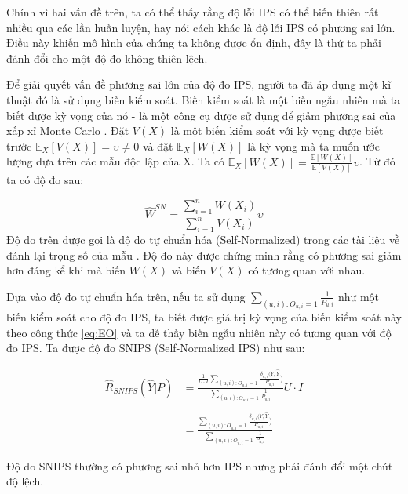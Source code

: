 Chính vì hai vấn đề trên, ta có thể thấy rằng độ lỗi IPS có thể biến thiên rất nhiều qua các lần huấn luyện, hay nói cách khác là độ lỗi IPS có phương sai lớn. Điều này khiến mô hình của chúng ta không được ổn định, đây là thứ ta phải đánh đổi cho một độ đo không thiên lệch. 

Để giải quyết vấn đề phương sai lớn của độ đo IPS, người ta đã áp dụng một kĩ thuật đó là sử dụng biến kiểm soát. Biến kiểm soát là một biến ngẫu nhiên mà ta biết được kỳ vọng của nó - là một công cụ được sử dụng để giảm phương sai của xấp xỉ Monte Carlo \cite{mcbook}. Đặt $V(X)$ là một biến kiểm soát với kỳ vọng được biết trước $\mathbb{E}_{X}[V(X)] = \upsilon \ne 0$ và đặt $\mathbb{E}_{X}[W(X)]$ là kỳ vọng mà ta muốn ước lượng dựa trên các mẫu độc lập của X. Ta có $\mathbb{E}_{X}[W(X)] = \frac{\mathbb{E}[W(X)]}{\mathbb{E}[V(X)]} \upsilon$. Từ đó ta có độ đo sau:

\begin{equation}
    \hat{W}^{SN} = \frac{\sum^n_{i=1} W (X_i)}{\sum^n_{i=1} V (X_i)} \upsilon
\end{equation}
 Độ đo trên được gọi là độ đo tự chuẩn hóa (Self-Normalized) trong các tài liệu về đánh lại trọng số của mẫu \cite{mcbook2}. Độ đo này được chứng minh rằng có phương sai giảm hơn đáng kể khi mà biến $W(X)$ và biến $V(X)$ có tương quan với nhau.
 
Dựa vào độ đo tự chuẩn hóa trên, nếu ta sử dụng $\sum_{(u,i):O_{u,i}=1} \frac{1}{P_{u,i}}$ như một biến kiểm soát cho độ đo IPS, ta biết được giá trị kỳ vọng của biến kiểm soát này theo công thức \ref{eq:EO} và ta dễ thấy biến ngẫu nhiên này có tương quan với độ đo IPS. Ta được độ đo SNIPS (Self-Normalized IPS) như sau: 

\begin{equation}
\begin{aligned}
    \label{eq:snips}
\hat{R}_{SNIPS}(\hat{Y}|P) &= \frac{\frac{1}{U \cdot I}\sum_{(u,i):O_{u,i}=1} \frac{ \delta_{u,i} (Y,\hat{Y}}{P_{u,i}})}{\sum_{(u,i):O_{u,i}=1} \frac{1}{P_{u,i}}} U \cdot I 
\\
\\ &= \frac{\sum_{(u,i):O_{u,i}=1} \frac{ \delta_{u,i} (Y,\hat{Y}}{P_{u,i}})}{\sum_{(u,i):O_{u,i}=1} \frac{1}{P_{u,i}}}
\end{aligned}
\end{equation}

Độ do SNIPS thường có phương sai nhỏ hơn IPS nhưng phải đánh đổi một chút độ lệch. 